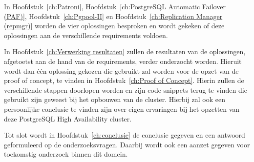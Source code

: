 In Hoofdstuk~\ref{ch:Patroni}, Hoofdstuk~\ref{ch:PostgreSQL Automatic Failover (PAF)}, Hoofdstuk~\ref{ch:Pgpool-II} en Hoofdstuk~\ref{ch:Replication Manager (repmgr)} worden de vier oplossingen besproken en wordt gekeken of deze oplossingen aan de verschillende requirements voldoen.

In Hoofdstuk~\ref{ch:Verwerking resultaten} zullen de resultaten van de oplossingen, afgetoetst aan de hand van de requirements, verder onderzocht worden. Hieruit wordt dan één oplossing gekozen die gebruikt zal worden voor de opzet van de proof of concept, te vinden in Hoofdstuk~\ref{ch:Proof of Concept}. Hierin zullen de verschillende stappen doorlopen worden en zijn code snippets terug te vinden die gebruikt zijn geweest bij het opbouwen van de cluster. Hierbij zal ook een persoonlijke conclusie te vinden zijn over eigen ervaringen bij het opzetten van deze PostgreSQL High Availability cluster.

Tot slot wordt in Hoofdstuk~\ref{ch:conclusie} de conclusie gegeven en een antwoord geformuleerd op de onderzoeksvragen. Daarbij wordt ook een aanzet gegeven voor toekomstig onderzoek binnen dit domein.
